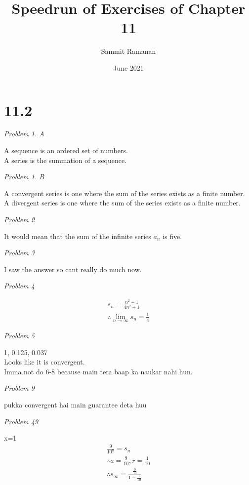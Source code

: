 \documentclass{article}
\title{Speedrun of Exercises of Chapter 11}
\date{June 2021}
\author{Sammit Ramanan}
\newcommand{\qst}[1]{\begin{center}\textit{Problem #1}\end{center}}
\begin{document}
\maketitle

\section*{11.2}
\qst{1. A}
A sequence is an ordered set of numbers.
\\A series is the summation of a sequence.
\qst{1. B}
A convergent series is one where the sum of the series exists as a finite number.
\\A divergent series is one where the sum of the series exists as a finite number.
\qst{2}
It would mean that the sum of the infinite series $a_n$ is five.
\qst{3}
I saw the answer so cant really do much now.
\qst{4}
\begin{gather*}
s_n=\frac{n^2-1}{4n^2+1}
\\\therefore \lim_{n\to\infty}s_n=\frac{1}{4}
\end{gather*}
\qst{5}
1, 0.125, 0.037
\\Looks like it is convergent.
\\Imma not do 6-8 because main tera baap ka naukar nahi hun.
\qst{9}
pukka convergent hai main guarantee deta huu
\qst{49}
x=1
\\\begin{gather*}
\frac{9}{10^n}=s_n
\\\therefore a=\frac{9}{10}, r=\frac{1}{10}
\\\therefore s_{\infty}=\frac{\frac{9}{10}}{1-\frac{1}{10}}
\end{gather*}
\end{document}
